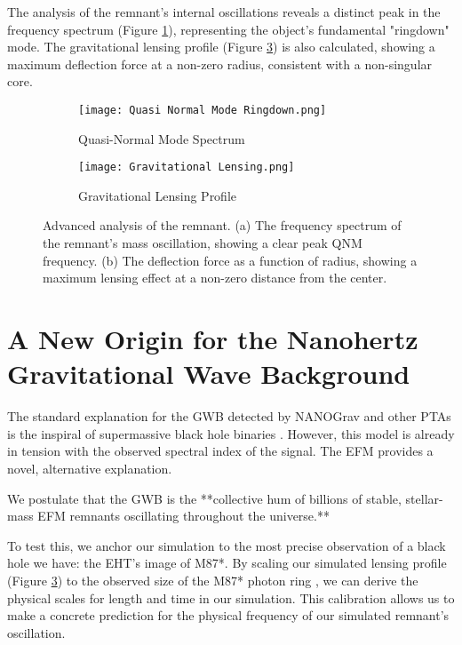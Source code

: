 \documentclass[11pt, twoside]{article}
\begin{document}
The analysis of the remnant's internal oscillations reveals a distinct peak in the frequency spectrum (Figure \ref{fig:qnm_spectrum}), representing the object's fundamental "ringdown" mode. The gravitational lensing profile (Figure \ref{fig:lensing_profile}) is also calculated, showing a maximum deflection force at a non-zero radius, consistent with a non-singular core.

\begin{figure}[h!]
    \centering
    \begin{subfigure}[b]{0.48\textwidth}
        \centering
        \texttt{[image: Quasi Normal Mode Ringdown.png]}
        \caption{Quasi-Normal Mode Spectrum}
        \label{fig:qnm_spectrum}
    \end{subfigure}
    \hfill
    \begin{subfigure}[b]{0.48\textwidth}
        \centering
        \texttt{[image: Gravitational Lensing.png]}
        \caption{Gravitational Lensing Profile}
        \label{fig:lensing_profile}
    \end{subfigure}
    \caption{Advanced analysis of the remnant. (a) The frequency spectrum of the remnant's mass oscillation, showing a clear peak QNM frequency. (b) The deflection force as a function of radius, showing a maximum lensing effect at a non-zero distance from the center.}
\end{figure}


\section{A New Origin for the Nanohertz Gravitational Wave Background}
The standard explanation for the GWB detected by NANOGrav and other PTAs is the inspiral of supermassive black hole binaries \citep{NANOGrav2023}. However, this model is already in tension with the observed spectral index of the signal. The EFM provides a novel, alternative explanation.

We postulate that the GWB is the **collective hum of billions of stable, stellar-mass EFM remnants oscillating throughout the universe.**

To test this, we anchor our simulation to the most precise observation of a black hole we have: the EHT's image of M87*. By scaling our simulated lensing profile (Figure \ref{fig:lensing_profile}) to the observed size of the M87* photon ring \citep{EHT2019}, we can derive the physical scales for length and time in our simulation. This calibration allows us to make a concrete prediction for the physical frequency of our simulated remnant's oscillation.
\end{document}
